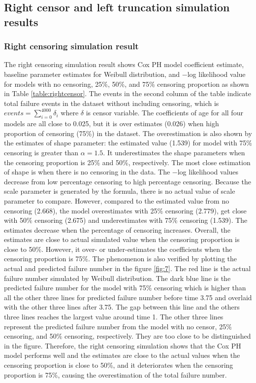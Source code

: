 \documentclass[12pt,letterpaper]{article}
\begin{document}
\subsection{Right censor and left truncation simulation results}
\subsubsection{Right censoring simulation result}
The right censoring simulation result shows Cox PH model coefficient estimate, baseline parameter estimates for Weibull distribution, and $-$log likelihood value for models with no censoring, 25\%, 50\%, and 75\% censoring proportion as shown in Table \ref{table:rightcensor}. The events in the second column of the table indicate total failure events in the dataset without including censoring, which is $events=\sum_{i=0}^{4000}{\delta_i}$ where $\delta$ is censor variable. The coefficients of age for all four models are all close to 0.025, but it is over estimates (0.026) when high proportion of censoring (75\%) in the dataset. The overestimation is also shown by the estimates of shape parameter: the estimated value (1.539) for model with 75\% censoring is greater than $\alpha=1.5$. It underestimates the shape parameters when the censoring proportion is 25\% and 50\%, respectively. The most close estimation of shape is when there is no censoring in the data. The $-$log likelihood values decrease from low percentage censoring to high percentage censoring. Because the scale parameter is generated by the formula, there is no actual value of scale parameter to compare. However, compared to the estimated value from no censoring (2.668), the model overestimates with 25\% censoring (2.779), get close with 50\% censoring (2.675) and underestimates with 75\% censoring (1.539). The estimates decrease when the percentage of censoring increases. Overall, the estimates are close to actual simulated value when the censoring proportion is close to 50\%. However, it over- or under-estimates the coefficients when the censoring proportion is 75\%. The phenomenon is also verified by plotting the actual and predicted failure number in the figure \ref{fig:7}.  The red line is the actual failure number simulated by Weibull distribution. The dark blue line is the predicted failure number for the model with 75\% censoring which is higher than all the other three lines for predicted failure number before time 3.75 and overlaid with the other three lines after 3.75. The gap between this line and the others three lines reaches the largest value around time 1. The other three lines represent the predicted failure number from the model with no censor, 25\% censoring, and 50\% censoring, respectively. They are too close to be distinguished in the figure. Therefore, the right censoring simulation shows that the Cox PH model performs well and the estimates are close to the actual values when the censoring proportion is close to 50\%, and it deteriorates when the censoring proportion is 75\%, causing the overestimation of the total failure number.
\end{document}
